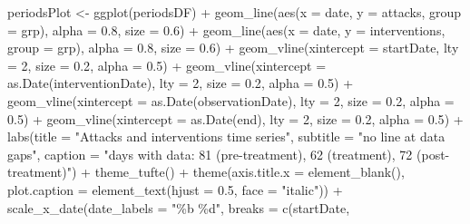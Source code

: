 \documentclass[
  10pt,
  dvipsnames, enabledeprecatedfontcommands]{scrartcl}
\newenvironment{Shaded}{\begin{snugshade}}{\end{snugshade}}
\newcommand{\AttributeTok}[1]{\textcolor[rgb]{0.77,0.63,0.00}{#1}}
\newcommand{\DecValTok}[1]{\textcolor[rgb]{0.00,0.00,0.81}{#1}}
\newcommand{\FloatTok}[1]{\textcolor[rgb]{0.00,0.00,0.81}{#1}}
\newcommand{\FunctionTok}[1]{\textcolor[rgb]{0.00,0.00,0.00}{#1}}
\newcommand{\NormalTok}[1]{#1}
\newcommand{\OtherTok}[1]{\textcolor[rgb]{0.56,0.35,0.01}{#1}}
\newcommand{\SpecialCharTok}[1]{\textcolor[rgb]{0.00,0.00,0.00}{#1}}
\newcommand{\StringTok}[1]{\textcolor[rgb]{0.31,0.60,0.02}{#1}}
\begin{document}
\begin{Shaded}
\begin{Highlighting}[]
\NormalTok{periodsPlot }\OtherTok{\textless{}{-}} \FunctionTok{ggplot}\NormalTok{(periodsDF) }\SpecialCharTok{+} \FunctionTok{geom\_line}\NormalTok{(}\FunctionTok{aes}\NormalTok{(}\AttributeTok{x =}\NormalTok{ date, }\AttributeTok{y =}\NormalTok{ attacks,}
    \AttributeTok{group =}\NormalTok{ grp), }\AttributeTok{alpha =} \FloatTok{0.8}\NormalTok{, }\AttributeTok{size =} \FloatTok{0.6}\NormalTok{) }\SpecialCharTok{+} \FunctionTok{geom\_line}\NormalTok{(}\FunctionTok{aes}\NormalTok{(}\AttributeTok{x =}\NormalTok{ date, }\AttributeTok{y =}\NormalTok{ interventions,}
    \AttributeTok{group =}\NormalTok{ grp), }\AttributeTok{alpha =} \FloatTok{0.8}\NormalTok{, }\AttributeTok{size =} \FloatTok{0.6}\NormalTok{) }\SpecialCharTok{+} \FunctionTok{geom\_vline}\NormalTok{(}\AttributeTok{xintercept =}\NormalTok{ startDate,}
    \AttributeTok{lty =} \DecValTok{2}\NormalTok{, }\AttributeTok{size =} \FloatTok{0.2}\NormalTok{, }\AttributeTok{alpha =} \FloatTok{0.5}\NormalTok{) }\SpecialCharTok{+} \FunctionTok{geom\_vline}\NormalTok{(}\AttributeTok{xintercept =} \FunctionTok{as.Date}\NormalTok{(interventionDate),}
    \AttributeTok{lty =} \DecValTok{2}\NormalTok{, }\AttributeTok{size =} \FloatTok{0.2}\NormalTok{, }\AttributeTok{alpha =} \FloatTok{0.5}\NormalTok{) }\SpecialCharTok{+} \FunctionTok{geom\_vline}\NormalTok{(}\AttributeTok{xintercept =} \FunctionTok{as.Date}\NormalTok{(observationDate),}
    \AttributeTok{lty =} \DecValTok{2}\NormalTok{, }\AttributeTok{size =} \FloatTok{0.2}\NormalTok{, }\AttributeTok{alpha =} \FloatTok{0.5}\NormalTok{) }\SpecialCharTok{+} \FunctionTok{geom\_vline}\NormalTok{(}\AttributeTok{xintercept =} \FunctionTok{as.Date}\NormalTok{(end),}
    \AttributeTok{lty =} \DecValTok{2}\NormalTok{, }\AttributeTok{size =} \FloatTok{0.2}\NormalTok{, }\AttributeTok{alpha =} \FloatTok{0.5}\NormalTok{) }\SpecialCharTok{+} \FunctionTok{labs}\NormalTok{(}\AttributeTok{title =} \StringTok{"Attacks and interventions time series"}\NormalTok{,}
    \AttributeTok{subtitle =} \StringTok{"no line at data gaps"}\NormalTok{, }\AttributeTok{caption =} \StringTok{"days with data: 81 (pre{-}treatment), 62 (treatment), 72 (post{-}treatment)"}\NormalTok{) }\SpecialCharTok{+}
    \FunctionTok{theme\_tufte}\NormalTok{() }\SpecialCharTok{+} \FunctionTok{theme}\NormalTok{(}\AttributeTok{axis.title.x =} \FunctionTok{element\_blank}\NormalTok{(), }\AttributeTok{plot.caption =} \FunctionTok{element\_text}\NormalTok{(}\AttributeTok{hjust =} \FloatTok{0.5}\NormalTok{,}
    \AttributeTok{face =} \StringTok{"italic"}\NormalTok{)) }\SpecialCharTok{+} \FunctionTok{scale\_x\_date}\NormalTok{(}\AttributeTok{date\_labels =} \StringTok{"\%b \%d"}\NormalTok{, }\AttributeTok{breaks =} \FunctionTok{c}\NormalTok{(startDate,}

\end{Highlighting}
\end{Shaded}
\end{document}
